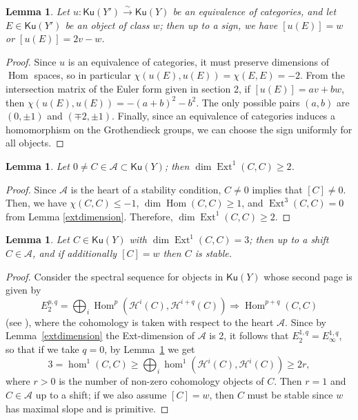 \documentclass[11pt]{amsart}
\newtheorem{lemma}[thm]{Lemma}
\theoremstyle{definition}
\DeclareMathOperator{\Hom}{Hom}
\DeclareMathOperator{\Ext}{Ext}
\newcommand{\sA}{\mathcal{A}}
\newcommand{\Ku}{\mathsf{Ku}}
\begin{document}
 \begin{lemma}
 Let $u \colon \Ku(Y') \xrightarrow{\sim} \Ku(Y)$ be an equivalence of categories, and let $E\in \Ku(Y')$ be an object of class $w$; then up to a sign, we have $[u(E)]=w$ or $[u(E)]=2v-w$.
 \end{lemma}
 \begin{proof}
Since $u$ is an equivalence of categories, it must preserve dimensions of $\Hom$ spaces, so in particular $\chi(u(E),u(E))=\chi(E,E)=-2$. From the intersection matrix of the Euler form given in section 2, if $[u(E)]=av+bw$, then $\chi(u(E),u(E))=-(a+b)^2-b^2$. The only possible pairs $(a,b)$ are $(0,\pm 1)$ and $(\mp 2,\pm 1)$. Finally, since an equivalence of categories induces a homomorphism on the Grothendieck groups, we can choose the sign uniformly for all objects.
\end{proof}
\begin{lemma}\label{dimext1} 
Let $0\neq C\in \mathcal{A}\subset \Ku(Y)$; then $\dim \Ext^1(C,C)\geq 2$.
\end{lemma}
\begin{proof}
Since $\sA$ is the heart of a stability condition, $C\neq 0$ implies that $[C]\neq 0$. Then, we have $\chi(C,C) \leq -1$, $\dim \Hom(C,C)\geq 1$, and $\Ext^3(C,C)=0$ from Lemma \ref{extdimension}. Therefore,  $\dim \Ext^1(C,C)\geq 2$.
\end{proof}
\begin{lemma}\label{ext1=3}
Let $C \in \Ku(Y)$ with $\dim\Ext^1(C,C)=3$; then up to a shift $C \in \mathcal{A}$, and if additionally $[C]=  w$ then $C$ is stable.
\end{lemma}
\begin{proof}
Consider the spectral sequence for objects in $\Ku(Y)$ whose second page is given by
\begin{equation}\label{spectral}
E^{p,q}_2 = \bigoplus_i \Hom^p(\mathcal{H}^i(C), \mathcal{H}^{i+q}(C)) \Longrightarrow \Hom^{p+q}(C,C)
\end{equation}
(see \cite[Lemma 4.5]{BMMS12}), where the cohomology is taken with respect to the heart $\mathcal{A}$. Since by Lemma~\ref{extdimension} the Ext-dimension of $\mathcal{A}$ is 2, it follows that $E^{1,q}_2=E^{1,q}_\infty$, so that if we take $q=0$, by Lemma~\ref{dimext1} we get
\[
3=\hom^1(C,C) \geq \bigoplus_i \hom^1(\mathcal{H}^i(C), \mathcal{H}^{i}(C)) \geq 2r,
\]
where $r>0$ is the number of non-zero cohomology objects of $C$. Then $r=1$ and $C\in \mathcal{A}$ up to a shift; if we also assume $[C]=w$, then $C$ must be stable since $w$ has maximal slope and is primitive.
\end{proof}
\end{document}
